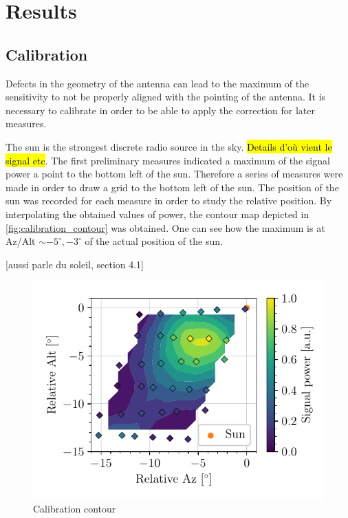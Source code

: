 \section{Results}
\subsection{Calibration}
Defects in the geometry of the antenna can lead to the maximum of the sensitivity to not be properly aligned with the pointing of the antenna.
It is necessary to calibrate in order to be able to apply the correction for later measures.


The sun is the strongest discrete radio source in the sky\cite{burke_introduction_2013}. \hl{Details d'où vient le signal etc}.
The first preliminary measures indicated a maximum of the signal power a point to the bottom left of the sun.
Therefore a series of measures were made in order to draw a grid to the bottom left of the sun. The position of the sun was recorded for each measure in order to study the relative position.
By interpolating the obtained values of power, the contour map depicted in \autoref{fig:calibration_contour} was obtained.
One can see how the maximum is at Az/Alt $\sim -5^{\circ}, -3^{\circ}$ of the actual position of the sun.

[aussi \cite{lauterbach_radio_2022} parle du soleil, section 4.1]

\begin{figure}[htbp]
    \centering
    \includegraphics[scale=1]{figures/calibration_contour.pdf}
    \caption{Calibration contour}
    \label{fig:calibration_contour}
\end{figure}

